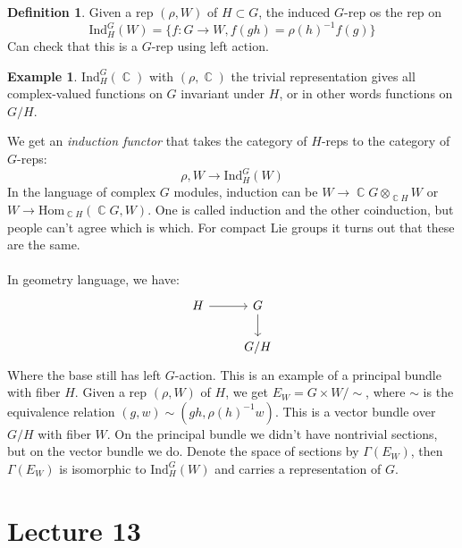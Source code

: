 \documentclass[12 pt]{article}
\DeclareMathOperator {\C} {\mathbb{C}}
\theoremstyle{plain}
\theoremstyle{definition}
\newtheorem{defn}{Definition}
\newtheorem{exmp}{Example}
\theoremstyle{remark}
\begin{document}
\begin{defn}
Given a rep $(\rho, W)$ of $H\subset G$, the induced $G$-rep os the rep on
\[     \text{Ind}_H^G (W) = \{ f: G \to W , f(gh) = \rho(h)^{-1} f(g)   \}       \]
Can check that this is a $G$-rep using left action.
\end{defn}
\begin{exmp}
$\text{Ind}_H^G(\C)$ with $(\rho, \C)$ the trivial representation gives all complex-valued functions on $G$ invariant under $H$, or in other words functions on $G/H$.
\end{exmp}
We get an \emph{induction functor} that takes the category of $H$-reps to the category of $G$-reps:
\[       \rho, W \to \text{Ind}_H^G (W)    \]
In the language of complex $G$ modules, induction can be $W \to \C G \otimes_{\C H} W$ or $W \to \text{Hom}_{\C H} (\C G, W)$. One is called induction and the other coinduction, but people can't agree which is which. For compact Lie groups it turns out that these are the same.
\\
\\
In geometry language, we have:
\[ 
\begin{tikzcd}
H\arrow{r} & G\arrow{d} \\
 & G/H
\end{tikzcd}
\]
Where the base still has left $G$-action. This is an example of a principal bundle with fiber $H$. Given a rep $(\rho, W)$ of $H$, we get $E_W = G \times W / \sim$, where $\sim$ is the equivalence relation $(g, w) \sim (gh, \rho(h)^{-1} w)$. This is a vector bundle over $G/H$ with fiber $W$. On the principal bundle we didn't have nontrivial sections, but on the vector bundle we do. Denote the space of sections by $\Gamma(E_W)$, then $\Gamma(E_W)$ is isomorphic to $\text{Ind}_H^G (W)$ and carries a representation of $G$.


\section*{Lecture 13}
\end{document}
